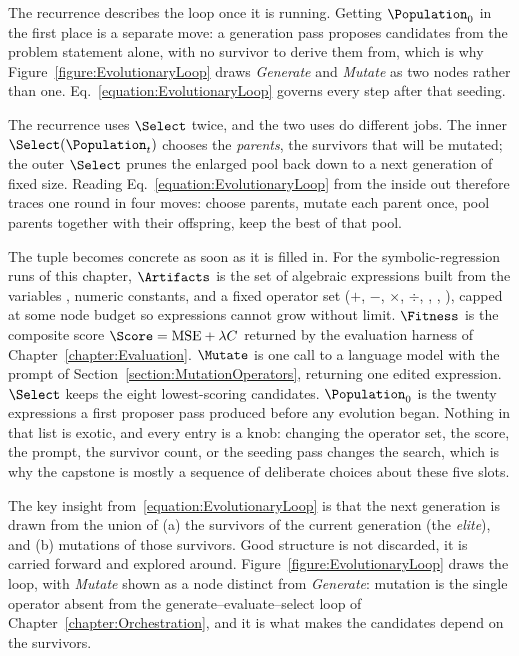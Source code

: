 The recurrence describes the loop once it is running.
Getting $\Population_0$ in the first place is a separate move: a generation pass proposes candidates from the problem statement alone, with no survivor to derive them from, which is why Figure~\ref{figure:EvolutionaryLoop} draws \emph{Generate} and \emph{Mutate} as two nodes rather than one.
Eq.~\eqref{equation:EvolutionaryLoop} governs every step after that seeding.

The recurrence uses $\Select$ twice, and the two uses do different jobs.
The inner $\Select(\Population_t)$ chooses the \emph{parents}, the survivors that will be mutated; the outer $\Select$ prunes the enlarged pool back down to a next generation of fixed size.
Reading Eq.~\eqref{equation:EvolutionaryLoop} from the inside out therefore traces one round in four moves: choose parents, mutate each parent once, pool parents together with their offspring, keep the best of that pool.

\begin{example}
The tuple becomes concrete as soon as it is filled in.
For the symbolic-regression runs of this chapter, $\Artifacts$ is the set of algebraic expressions built from the variables , numeric constants, and a fixed operator set ($+$, $-$, $\times$, $\div$, , , ), capped at some node budget so expressions cannot grow without limit.
$\Fitness$ is the composite score $\Score = \mathrm{MSE} + \lambda C$ returned by the evaluation harness of Chapter~\ref{chapter:Evaluation}.
$\Mutate$ is one call to a language model with the prompt of Section~\ref{section:MutationOperators}, returning one edited expression.
$\Select$ keeps the eight lowest-scoring candidates.
$\Population_0$ is the twenty expressions a first proposer pass produced before any evolution began.
Nothing in that list is exotic, and every entry is a knob: changing the operator set, the score, the prompt, the survivor count, or the seeding pass changes the search, which is why the capstone is mostly a sequence of deliberate choices about these five slots.
\end{example}

The key insight from~\eqref{equation:EvolutionaryLoop} is that the next generation is drawn from the union of (a) the survivors of the current generation (the \emph{elite}), and (b) mutations of those survivors.
Good structure is not discarded, it is carried forward and explored around.
Figure~\ref{figure:EvolutionaryLoop} draws the loop, with \emph{Mutate} shown as a node distinct from \emph{Generate}: mutation is the single operator absent from the generate--evaluate--select loop of Chapter~\ref{chapter:Orchestration}, and it is what makes the candidates depend on the survivors.

